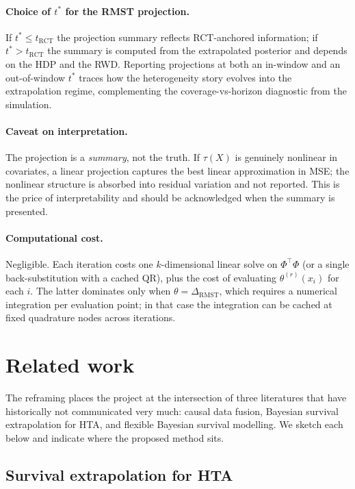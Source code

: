 \documentclass[11pt]{article}
\theoremstyle{plain}
\theoremstyle{definition}
\theoremstyle{remark}
\newcommand{\1}{\mathds{1}}
\newcommand{\X}{X}
\newcommand{\tauf}{\tau}
\newcommand{\RCT}{\mathrm{RCT}}
\newcommand{\RMST}{\mathrm{RMST}}
\begin{document}
\paragraph{Choice of $t^{*}$ for the RMST projection.} If $t^{*} \leq
t_{\RCT}$ the projection summary reflects RCT-anchored information; if
$t^{*} > t_{\RCT}$ the summary is computed from the extrapolated posterior
and depends on the HDP and the RWD. Reporting projections at both an
in-window and an out-of-window $t^{*}$ traces how the heterogeneity story
evolves into the extrapolation regime, complementing the
coverage-vs-horizon diagnostic from the simulation.

\paragraph{Caveat on interpretation.} The projection is a \emph{summary},
not the truth. If $\tauf(\X)$ is genuinely nonlinear in covariates, a
linear projection captures the best linear approximation in MSE; the
nonlinear structure is absorbed into residual variation and not reported.
This is the price of interpretability and should be acknowledged when the
summary is presented.

\paragraph{Computational cost.} Negligible. Each iteration costs one
$k$-dimensional linear solve on $\Phi^{\top}\Phi$ (or a single
back-substitution with a cached QR), plus the cost of evaluating
$\theta^{(r)}(x_{i})$ for each $i$. The latter dominates only when
$\theta = \Delta_{\RMST}$, which requires a numerical integration per
evaluation point; in that case the integration can be cached at fixed
quadrature nodes across iterations.

\section{Related work}

The reframing places the project at the intersection of three literatures
that have historically not communicated very much: causal data fusion,
Bayesian survival extrapolation for HTA, and flexible Bayesian survival
modelling. We sketch each below and indicate where the proposed method sits.

\subsection{Survival extrapolation for HTA}
\end{document}
